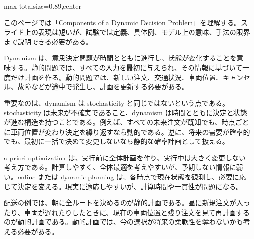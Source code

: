 \begin{minipage}[t]{0.58\textwidth}
\begin{adjustbox}{max totalsize={\textwidth}{0.89\textheight},center}
\begin{minipage}{\textwidth}\scriptsize
{}このページでは「Components of a Dynamic Decision Problem」を理解する。スライド上の表現は短いが、試験では定義、具体例、モデル上の意味、手法の限界まで説明できる必要がある。\par
Dynamism は、意思決定問題が時間とともに進行し、状態が変化することを意味する。静的問題では、すべての入力を最初に与えられ、その情報に基づいて一度だけ計画を作る。動的問題では、新しい注文、交通状況、車両位置、キャンセル、故障などが途中で発生し、計画を更新する必要がある。\par
重要なのは、dynamism は stochasticity と同じではないという点である。stochasticity は未来が不確実であること、dynamism は時間とともに決定と状態が進む構造を持つことである。例えば、すべての未来注文が既知でも、時点ごとに車両位置が変わり決定を繰り返すなら動的である。逆に、将来の需要が確率的でも、最初に一括で決めて変更しないなら静的な確率計画として扱える。\par
a priori optimization は、実行前に全体計画を作り、実行中は大きく変更しない考え方である。計算しやすく、全体最適を考えやすいが、予期しない情報に弱い。online または dynamic planning は、各時点で現在状態を観測し、必要に応じて決定を変える。現実に適応しやすいが、計算時間や一貫性が問題になる。\par
配送の例では、朝に全ルートを決めるのが静的計画である。昼に新規注文が入ったり、車両が遅れたりしたときに、現在の車両位置と残り注文を見て再計画するのが動的計画である。動的計画では、今の選択が将来の柔軟性を奪わないかも考える必要がある。\par

\end{minipage}
\end{adjustbox}
\end{minipage}
